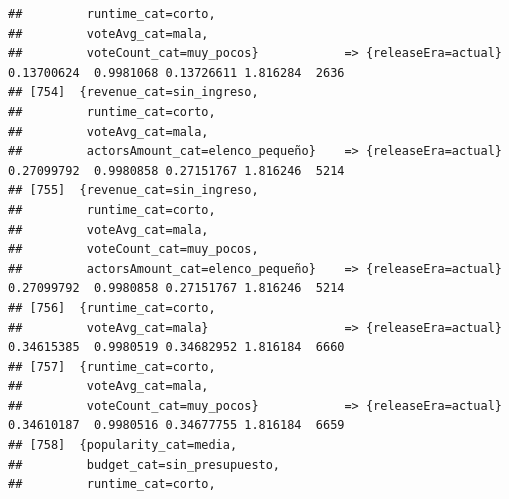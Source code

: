 \documentclass[
]{article}
\begin{document}
\begin{verbatim}
##         runtime_cat=corto,                                                                                                      
##         voteAvg_cat=mala,                                                                                                       
##         voteCount_cat=muy_pocos}            => {releaseEra=actual}               0.13700624  0.9981068 0.13726611 1.816284  2636
## [754]  {revenue_cat=sin_ingreso,                                                                                                
##         runtime_cat=corto,                                                                                                      
##         voteAvg_cat=mala,                                                                                                       
##         actorsAmount_cat=elenco_pequeño}    => {releaseEra=actual}               0.27099792  0.9980858 0.27151767 1.816246  5214
## [755]  {revenue_cat=sin_ingreso,                                                                                                
##         runtime_cat=corto,                                                                                                      
##         voteAvg_cat=mala,                                                                                                       
##         voteCount_cat=muy_pocos,                                                                                                
##         actorsAmount_cat=elenco_pequeño}    => {releaseEra=actual}               0.27099792  0.9980858 0.27151767 1.816246  5214
## [756]  {runtime_cat=corto,                                                                                                      
##         voteAvg_cat=mala}                   => {releaseEra=actual}               0.34615385  0.9980519 0.34682952 1.816184  6660
## [757]  {runtime_cat=corto,                                                                                                      
##         voteAvg_cat=mala,                                                                                                       
##         voteCount_cat=muy_pocos}            => {releaseEra=actual}               0.34610187  0.9980516 0.34677755 1.816184  6659
## [758]  {popularity_cat=media,                                                                                                   
##         budget_cat=sin_presupuesto,                                                                                             
##         runtime_cat=corto,                                                                                                      

\end{verbatim}
\end{document}
